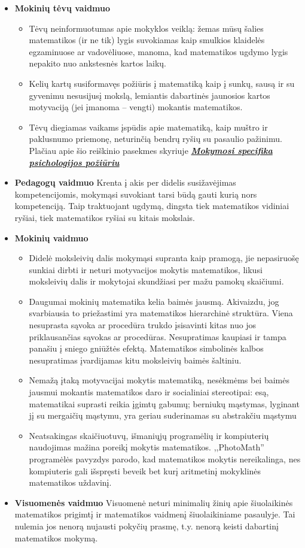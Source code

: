 \documentclass{article}
\begin{document}
\begin{itemize}
\item \textbf{Mokinių tėvų vaidmuo}
\begin{itemize}
\item Tėvų neinformuotumas apie mokyklos veiklą: žemas mūsų šalies matematikos (ir ne tik) lygis suvokiamas kaip smulkios klaidelės egzaminuose ar vadovėliuose, manoma, kad matematikos ugdymo lygis nepakito nuo ankstesnės kartos laikų.
\item Kelių kartų susiformavęs požiūris į matematiką kaip į sunkų, sausą ir su gyvenimu nesusijusį mokslą, lemiantis dabartinės jaunosios kartos motyvaciją (jei įmanoma – vengti) mokantis matematikos.
\item Tėvų diegiamas vaikams įspūdis apie matematiką, kaip muštro ir paklusnumo priemonę, neturinčią bendrų ryšių su pasaulio pažinimu. Plačiau apie šio reiškinio pasekmes skyriuje \hyperlink{mspp}{\textit{\textbf{Mokymosi specifika psichologijos požiūriu}}}
\end{itemize}
\item \textbf{Pedagogų vaidmuo} Krenta į akis per didelis susižavėjimas kompetencijomis, mokymąsi suvokiant tarsi būdą gauti kurią nors kompetenciją. Taip traktuojant ugdymą, dingsta tiek matematikos vidiniai ryšiai, tiek matematikos ryšiai su kitais mokslais. 
\item \textbf{Mokinių vaidmuo}
\begin{itemize}
\item Didelė moksleivių dalis mokymąsi supranta kaip pramogą, jie nepasiruošę sunkiai dirbti ir neturi motyvacijos mokytis matematikos, likusi moksleivių dalis ir mokytojai skundžiasi per mažu pamokų skaičiumi.
\item Daugumai mokinių matematika kelia baimės jausmą.  Akivaizdu, jog svarbiausia to priežastimi yra matematikos hierarchinė struktūra. Viena nesuprasta sąvoka ar procedūra trukdo įsisavinti kitas nuo jos priklausančias sąvokas  ar procedūras. Nesupratimas kaupiasi ir tampa panašiu į sniego gniūžtės efektą. Matematikos simbolinės kalbos nesupratimas įvardijamas kitu moksleivių baimės šaltiniu.    
\item Nemažą įtaką motyvacijai mokytis  matematiką, nesėkmėms bei baimės jausmui mokantis matematikos  daro ir socialiniai stereotipai: esą, matematikai  suprasti  reikia  įgimtų  gabumų; berniukų  mąstymas,  lyginant  jį  su  mergaičių  mąstymu,  yra  geriau  suderinamas  su  abstrakčiu mąstymu
\item Neatsakingas skaičiuotuvų, išmaniųjų programėlių ir kompiuterių naudojimas mažina poreikį mokytis matematikos. ,,PhotoMath'' programėlės pavyzdys parodo, kad matematikos mokytis nereikalinga, nes kompiuteris gali išspręsti beveik bet kurį aritmetinį mokyklinės matematikos uždavinį.
\end{itemize}
\item \textbf{Visuomenės vaidmuo} Visuomenė neturi minimalių žinių apie šiuolaikinės matematikos prigimtį ir matematikos vaidmenį šiuolaikiniame pasaulyje. Tai nulemia jos nenorą nujausti pokyčių prasmę, t.y. nenorą keisti dabartinį matematikos mokymą. 
\end{itemize}
\end{document}
